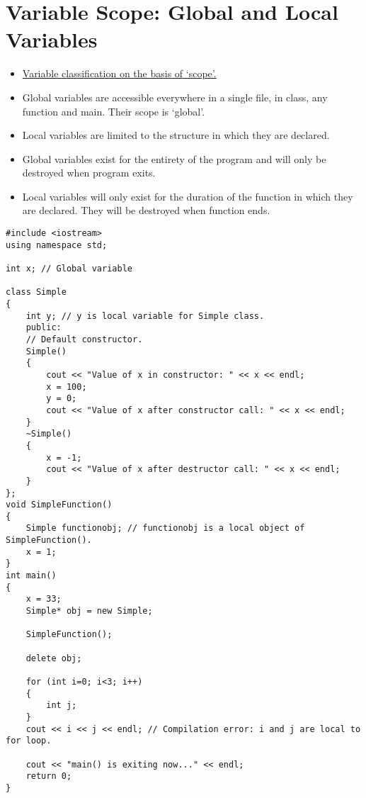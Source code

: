 \documentclass[12pt,a4paper]{article}
\begin{document}
\section{Variable Scope: Global and Local Variables}
\begin{itemize}
\item \underline{Variable classification on the basis of `scope'.}
\item Global variables are accessible everywhere in a single file, in class, any function and main. Their scope is `global'.
\item Local variables are limited to the structure in which they are declared.
\item Global variables exist for the entirety of the program and will only be destroyed when program exits.
\item Local variables will only exist for the duration of the function in which they are declared. They will be destroyed when function ends.
\end{itemize}
\begin{lstlisting}[caption={Variable Scope}]
#include <iostream>
using namespace std;

int x; // Global variable

class Simple
{
	int y; // y is local variable for Simple class.
	public:
	// Default constructor.
	Simple()
	{
		cout << "Value of x in constructor: " << x << endl;
		x = 100;
		y = 0;
		cout << "Value of x after constructor call: " << x << endl;
	}
	~Simple()
	{
		x = -1;
		cout << "Value of x after destructor call: " << x << endl;
	}
};
void SimpleFunction()
{
	Simple functionobj; // functionobj is a local object of SimpleFunction().
	x = 1;
}
int main()
{
	x = 33;
	Simple* obj = new Simple;

	SimpleFunction();

	delete obj;

	for (int i=0; i<3; i++)
	{
		int j;
	}
	cout << i << j << endl; // Compilation error: i and j are local to for loop.

	cout << "main() is exiting now..." << endl;
	return 0;
}
\end{lstlisting}
\end{document}
